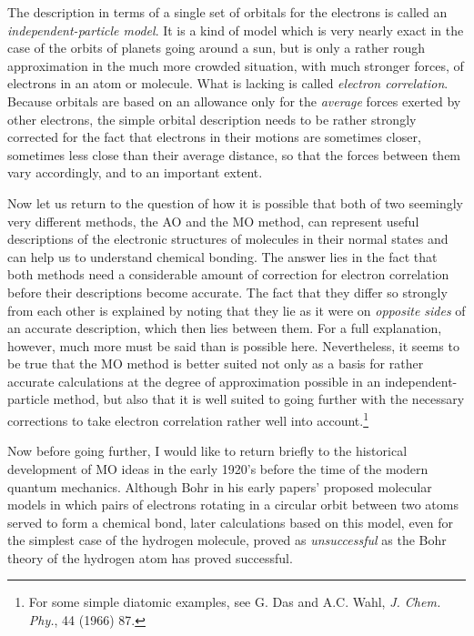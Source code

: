 \documentclass[11pt]{memoir}
\begin{document}
The description in terms of a single set of orbitals for the electrons is called an \emph{independent-particle model}.  It is a kind of model which is very nearly exact in the case of the orbits of planets going around a sun, but is only a rather rough approximation in the much more crowded situation, with much stronger forces, of electrons in an atom or molecule.  What is lacking is called \emph{electron correlation}.  Because orbitals are based on an allowance only for the \emph{average} forces exerted by other electrons, the simple orbital description needs to be rather strongly corrected for the fact that electrons in their motions are sometimes closer, sometimes less close than their average distance, so that the forces between them vary accordingly, and to an important extent.

Now let us return to the question of how it is possible that both of two seemingly very different methods, the AO and the MO method, can represent useful descriptions of the electronic structures of molecules in their normal states and can help us to understand chemical bonding.  The answer lies in the fact that both methods need a considerable amount of correction for electron correlation before their descriptions become accurate.  The fact that they differ so strongly from each other is explained by noting that they lie as it were on \emph{opposite sides} of an accurate description, which then lies between them.  For a full explanation, however, much more must be said than is possible here.  Nevertheless, it seems to be true that the MO method is better suited not only as a basis for rather accurate calculations at the degree of approximation possible in an independent-particle method, but also that it is well suited to going further with the necessary corrections to take electron correlation rather well into account.\footnote{For some simple diatomic examples, see G. Das and A.C. Wahl, \emph{J. Chem. Phy.}, 44 (1966) 87.}

Now before going further, I would like to return briefly to the historical development of MO ideas in the early 1920's before the time of the modern quantum mechanics.  Although Bohr in his early papers' proposed molecular models in which pairs of electrons rotating in a circular orbit between two atoms served to form a chemical bond, later calculations based on this model, even for the simplest case of the hydrogen molecule, proved as \emph{unsuccessful} as the Bohr theory of the hydrogen atom has proved successful.
\end{document}
